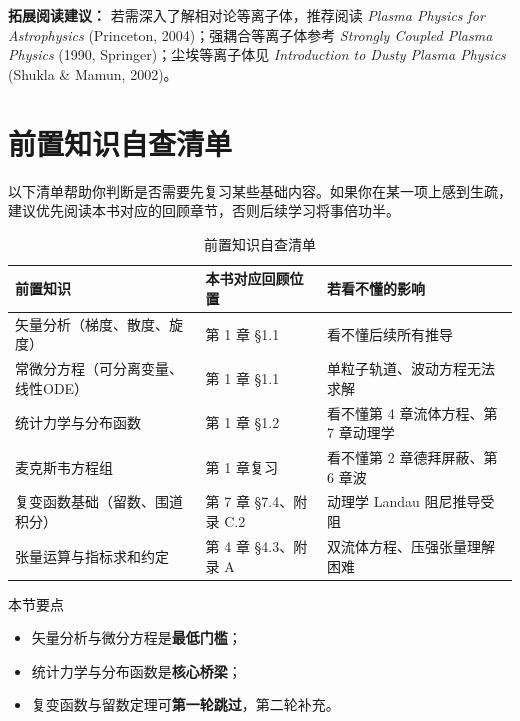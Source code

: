 \documentclass[12pt,a4paper,openany,oneside]{book}
\begin{document}
\begin{tip}
\textbf{拓展阅读建议：}
若需深入了解相对论等离子体，推荐阅读 \textit{Plasma Physics for Astrophysics}
(Princeton, 2004)；强耦合等离子体参考 \textit{Strongly Coupled Plasma Physics}
(1990, Springer)；尘埃等离子体见 \textit{Introduction to Dusty Plasma Physics}
(Shukla \& Mamun, 2002)。
\end{tip}


\section*{前置知识自查清单}

以下清单帮助你判断是否需要先复习某些基础内容。如果你在某一项上感到生疏，
建议优先阅读本书对应的回顾章节，否则后续学习将事倍功半。

\begin{table}[htbp]
\centering
\caption{前置知识自查清单}
\small
\begin{tabular}{@{}p{4.2cm}p{3cm}p{5.2cm}@{}}
\toprule
\textbf{前置知识} & \textbf{本书对应回顾位置} & \textbf{若看不懂的影响} \\
\midrule
矢量分析（梯度、散度、旋度） & 第 1 章 \S 1.1 & 看不懂后续所有推导 \\
常微分方程（可分离变量、线性ODE） & 第 1 章 \S 1.1 & 单粒子轨道、波动方程无法求解 \\
统计力学与分布函数 & 第 1 章 \S 1.2 & 看不懂第 4 章流体方程、第 7 章动理学 \\
麦克斯韦方程组 & 第 1 章复习 & 看不懂第 2 章德拜屏蔽、第 6 章波 \\
复变函数基础（留数、围道积分） & 第 7 章 \S 7.4、附录 C.2 & 动理学 Landau 阻尼推导受阻 \\
张量运算与指标求和约定 & 第 4 章 \S 4.3、附录 A & 双流体方程、压强张量理解困难 \\
\bottomrule
\end{tabular}
\end{table}

\begin{review}{本节要点}{}
\begin{itemize}
\item 矢量分析与微分方程是\textbf{最低门槛}；
\item 统计力学与分布函数是\textbf{核心桥梁}；
\item 复变函数与留数定理可\textbf{第一轮跳过}，第二轮补充。
\end{itemize}
\end{review}
\end{document}

